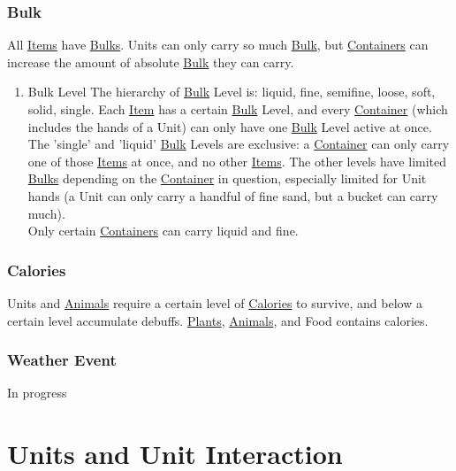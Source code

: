 \documentclass[11pt]{article}
\begin{document}
\subsubsection{Bulk \label{org7af52ad} \label{org0f875af}}
\label{sec:org4bda77a}
All \hyperref[org4612467]{Items} have \hyperref[org0f875af]{Bulks}. Units can only carry so much \hyperref[org7af52ad]{Bulk}, but \hyperref[org0f27c43]{Containers} can increase the amount of absolute \hyperref[org7af52ad]{Bulk} they can carry.\\
\begin{enumerate}
\item Bulk Level
\label{sec:org7bab7bf}
The hierarchy of \hyperref[org7af52ad]{Bulk} Level is: liquid, fine, semifine, loose, soft, solid, single. Each \hyperref[org1f7c3b7]{Item} has a certain \hyperref[org7af52ad]{Bulk} Level, and every \hyperref[orge5316d5]{Container} (which includes the hands of a Unit) can only have one \hyperref[org7af52ad]{Bulk} Level active at once. The 'single' and 'liquid' \hyperref[org7af52ad]{Bulk} Levels are exclusive: a \hyperref[orge5316d5]{Container} can only carry one of those \hyperref[org4612467]{Items} at once, and no other \hyperref[org4612467]{Items}. The other levels have limited \hyperref[org0f875af]{Bulks} depending on the \hyperref[orge5316d5]{Container} in question, especially limited for Unit hands (a Unit can only carry a handful of fine sand, but a bucket can carry much).\\

Only certain \hyperref[org0f27c43]{Containers} can carry liquid and fine.\\
\end{enumerate}
\subsubsection{Calories \label{org7e6ab9b} \label{orgcfc2947}}
\label{sec:orgc7e786a}
Units and \hyperref[orgb1f888f]{Animals} require a certain level of \hyperref[org7e6ab9b]{Calories} to survive, and below a certain level accumulate debuffs. \hyperref[org6e70fa0]{Plants}, \hyperref[orgb1f888f]{Animals}, and Food contains calories.\\
\subsubsection{Weather Event \label{org076d8b5} \label{org3b0b756}}
\label{sec:org55118b0}
In progress\\
\section{Units and Unit Interaction}
\label{sec:orgc59c3cc}
\end{document}
